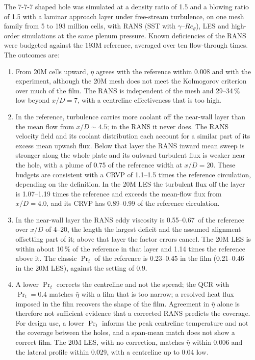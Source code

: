 \documentclass[colorlinks,upint,subscriptcorrection,varvw,hyphenate,balance,lineno]{asmeconf}
\newcommand*{\Reth}{\mathit{Re}_\theta}
\newcommand*{\etab}{\bar\eta}
\newcommand*{\xEVstart}{4}%
\newcommand*{\muNearLow}{0.55}%
\newcommand*{\muNearHigh}{0.67}%
\begin{document}
The 7-7-7 shaped hole was simulated at a density ratio of 1.5 and a blowing ratio of 1.5 with a laminar approach
layer under free-stream turbulence, on one mesh family from 5 to 193 million cells, with RANS (SST with
$\gamma$--$\Reth$), LES and high-order simulations at the same plenum pressure. Known deficiencies of the RANS were
budgeted against the 193M reference, averaged over ten flow-through times. The outcomes are:
\begin{enumerate}
\item From 20M cells upward, $\etab$ agrees with the reference within 0.008 and with the experiment, although the
  20M mesh does not meet the Kolmogorov criterion over much of the film. The RANS is independent of the mesh and
  29--34\,\% low beyond $x/D=7$, with a centreline effectiveness that is too high.
\item In the reference, turbulence carries more coolant off the near-wall layer than the mean flow from
  $x/D\sim4.5$; in the RANS it never does. The RANS velocity field and its coolant distribution each account for a
  similar part of its excess mean upwash flux. Below that layer the RANS inward mean sweep is stronger along the
  whole plate and its outward turbulent flux is weaker near the hole, with a plume of 0.75 of the reference
  width at $x/D=20$. These budgets are consistent with a CRVP of 1.1--1.5 times the reference circulation,
  depending on the definition. In the 20M LES the turbulent flux off the layer is 1.07--1.19 times the reference and exceeds the
  mean-flow flux from $x/D=4.0$, and its CRVP has 0.89--0.99 of the reference circulation.
\item In the near-wall layer the RANS eddy viscosity is \muNearLow--\muNearHigh\ of the reference over $x/D$ of
  \xEVstart--20, the length the
  largest deficit and the assumed alignment offsetting part of it; above that layer the factor errors cancel. The
  20M LES is within about 10\,\% of the reference in that layer and 1.14 times the reference above it. The
  classic $\Pr_t$ of the reference is 0.23--0.45 in the film (0.21--0.46 in the 20M LES), against the setting
  of 0.9.
\item A lower $\Pr_t$ corrects the centreline and not the spread; the QCR with $\Pr_t=0.4$ matches $\etab$ with a
  film that is too narrow; a resolved heat flux imposed in the film recovers the shape of the film. Agreement in
  $\etab$ alone is therefore not sufficient evidence that a corrected RANS predicts the coverage. For design use,
  a lower $\Pr_t$ informs the peak centreline temperature and not the coverage between the holes, and a span-mean
  match does not show a correct film. The 20M LES,
  with no correction, matches $\etab$ within 0.006 and the lateral profile within 0.029, with a centreline up to
  0.04 low.
\end{enumerate}
\end{document}
